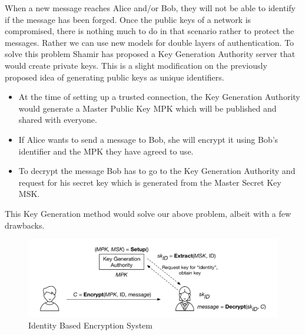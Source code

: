 \documentclass{article}
\begin{document}
\begin{enumerate}[label=\alph*]
When a new message reaches Alice and/or Bob, they will not be able to identify if the message has been forged. Once the public keys of a network is compromised, there is nothing much to do in that scenario rather to protect the messages. Rather we can use new models for double layers of authentication.
To solve this problem Shamir has proposed a Key Generation Authority server that would create private keys. This is a slight modification on the previously proposed idea of generating public keys as unique identifiers. 
\begin{itemize}

\item At the time of setting up a trusted connection, the Key Generation Authority would generate a Master Public Key MPK which will be published and shared with everyone. 
\item If Alice wants to send a message to Bob, she will encrypt it using Bob's identifier and the MPK they have agreed to use. 
\item To decrypt the message Bob has to go to the Key Generation Authority and request for his secret key which is generated from the Master Secret Key MSK.
\end{itemize}
This Key Generation method would solve our above problem, albeit with a few drawbacks.

\begin{figure}[h!]
\centering
\includegraphics[scale=0.5]{key_generation_authority.png}
\caption{Identity Based Encryption System}
\label{fig:aesni_output_in_c}
\end{figure}

\end{enumerate}
\end{document}
